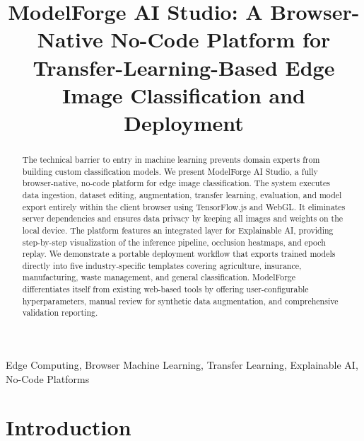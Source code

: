 \documentclass[conference]{IEEEtran}
\begin{document}
\title{ModelForge AI Studio: A Browser-Native No-Code Platform for Transfer-Learning-Based Edge Image Classification and Deployment}

\author{
}

\maketitle

\begin{abstract}
The technical barrier to entry in machine learning prevents domain experts from building custom classification models. We present ModelForge AI Studio, a fully browser-native, no-code platform for edge image classification. The system executes data ingestion, dataset editing, augmentation, transfer learning, evaluation, and model export entirely within the client browser using TensorFlow.js and WebGL. It eliminates server dependencies and ensures data privacy by keeping all images and weights on the local device. The platform features an integrated layer for Explainable AI, providing step-by-step visualization of the inference pipeline, occlusion heatmaps, and epoch replay. We demonstrate a portable deployment workflow that exports trained models directly into five industry-specific templates covering agriculture, insurance, manufacturing, waste management, and general classification. ModelForge differentiates itself from existing web-based tools by offering user-configurable hyperparameters, manual review for synthetic data augmentation, and comprehensive validation reporting.
\end{abstract}

\begin{IEEEkeywords}
Edge Computing, Browser Machine Learning, Transfer Learning, Explainable AI, No-Code Platforms
\end{IEEEkeywords}

\section{Introduction}
\end{document}
